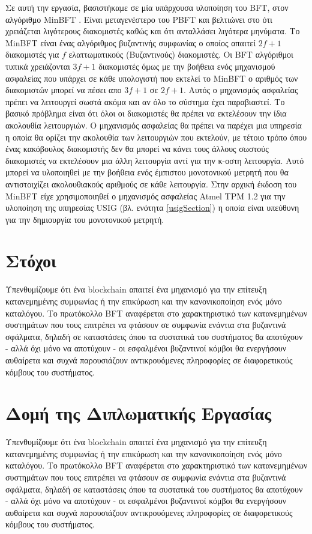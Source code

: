 Σε αυτή την εργασία, βασιστήκαμε σε μία υπάρχουσα υλοποίηση του BFT, στον αλγόριθμο MinBFT \cite{minbftpaper}. Είναι μεταγενέστερο του PBFT και βελτιώνει στο ότι χρειάζεται λιγότερους διακομιστές καθώς και ότι ανταλλάσει λιγότερα μηνύματα. Το MinBFT είναι ένας αλγόριθμος βυζαντινής συμφωνίας ο οποίος απαιτεί $2f+1$ διακομιστές για $f$ ελαττωματικούς (Βυζαντινούς) διακομιστές. Οι BFT αλγόριθμοι τυπικά χρειάζονται $3f+1$ διακομιστές όμως με την βοήθεια ενός μηχανισμού ασφαλείας που υπάρχει σε κάθε υπολογιστή που εκτελεί το MinBFT ο αριθμός των διακομιστών μπορεί να πέσει απο $3f+1$ σε $2f+1$. Αυτός ο μηχανισμός ασφαλείας πρέπει να λειτουργεί σωστά ακόμα και αν όλο το σύστημα έχει παραβιαστεί. Το βασικό πρόβλημα είναι ότι όλοι οι διακομιστές θα πρέπει να εκτελέσουν την ίδια ακολουθία λειτουργιών. Ο μηχανισμός ασφαλείας θα πρέπει να παρέχει μια υπηρεσία η οποία θα ορίζει την ακολουθία των λειτουργιών που εκτελούν,  με τέτοιο τρόπο όπου ένας κακόβουλος διακομιστής δεν θα μπορεί να κάνει τους άλλους σωστούς διακομιστές να εκτελέσουν μια άλλη λειτουργία αντί για την κ-οστη λειτουργία. Αυτό μπορεί να υλοποιηθεί με την βοήθεια ενός έμπιστου μονοτονικού μετρητή που θα αντιστοιχίζει ακολουθιακούς αριθμούς σε κάθε λειτουργία. Στην αρχική έκδοση του MinBFT \cite{minbftpaper} είχε χρησιμοποιηθεί ο μηχανισμός ασφαλείας Atmel TPM 1.2 για την υλοποίηση της υπηρεσίας USIG (βλ. ενότητα \ref{usigSection}) η οποία είναι υπεύθυνη για την δημιουργία του μονοτονικού μετρητή. 


\section{Στόχοι}
Υπενθυμίζουμε ότι ένα blockchain απαιτεί ένα μηχανισμό για την επίτευξη κατανεμημένης συμφωνίας ή την επικύρωση και την κανονικοποίηση ενός μόνο καταλόγου. Το πρωτόκολλο BFT αναφέρεται στο χαρακτηριστικό των κατανεμημένων συστημάτων που τους επιτρέπει να φτάσουν σε συμφωνία ενάντια στα βυζαντινά σφάλματα, δηλαδή σε καταστάσεις όπου τα συστατικά του συστήματος θα αποτύχουν - αλλά όχι μόνο να αποτύχουν - οι εσφαλμένοι βυζαντινοί κόμβοι θα ενεργήσουν αυθαίρετα και συχνά παρουσιάζουν αντικρουόμενες πληροφορίες σε διαφορετικούς κόμβους του συστήματος.

\section{Δομή της Διπλωματικής Εργασίας} \label{domi}
Υπενθυμίζουμε ότι ένα blockchain απαιτεί ένα μηχανισμό για την επίτευξη κατανεμημένης συμφωνίας ή την επικύρωση και την κανονικοποίηση ενός μόνο καταλόγου. Το πρωτόκολλο BFT αναφέρεται στο χαρακτηριστικό των κατανεμημένων συστημάτων που τους επιτρέπει να φτάσουν σε συμφωνία ενάντια στα βυζαντινά σφάλματα, δηλαδή σε καταστάσεις όπου τα συστατικά του συστήματος θα αποτύχουν - αλλά όχι μόνο να αποτύχουν - οι εσφαλμένοι βυζαντινοί κόμβοι θα ενεργήσουν αυθαίρετα και συχνά παρουσιάζουν αντικρουόμενες πληροφορίες σε διαφορετικούς κόμβους του συστήματος.